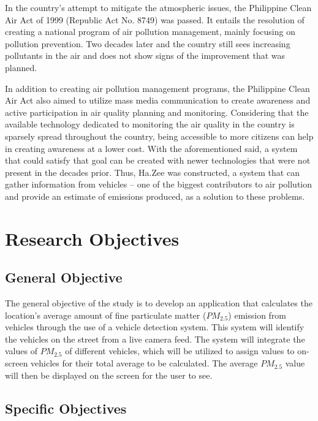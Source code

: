 In the country’s attempt to mitigate the atmospheric issues, the Philippine Clean Air Act of 1999 (Republic Act No. 8749) was passed. \cite{FAO} It entails the resolution of creating a national program of air pollution management, mainly focusing on pollution prevention. Two decades later and the country still sees increasing pollutants in the air and does not show signs of the improvement that was planned.

In addition to creating air pollution management programs, the Philippine Clean Air Act also aimed to utilize mass media communication to create awareness and active participation in air quality planning and monitoring. Considering that the available technology dedicated to monitoring the air quality in the country is sparsely spread throughout the country, being accessible to more citizens can help in creating awareness at a lower cost. With the aforementioned said, a system that could satisfy that goal can be created with newer technologies that were not present in the decades prior. Thus, Ha.Zee was constructed, a system that can gather information from vehicles – one of the biggest contributors to air pollution and provide an estimate of emissions produced, as a solution to these problems. 


\section{Research Objectives}
\label{sec:researchobjectives}

\subsection{General Objective}
\label{sec:generalobjective}


The general objective of the study is to develop an application that calculates the location’s average amount of  fine particulate matter ($PM_{2.5}$) emission from vehicles through the use of a vehicle detection system. This system will identify the vehicles on the street from a live camera feed. The system will integrate the values of $PM_{2.5}$  of different vehicles, which will be utilized to assign values to on-screen vehicles for their total average to be calculated. The average $PM_{2.5}$ value will then be displayed on the screen for the user to see.



\subsection{Specific Objectives}
\label{sec:specificobjectives}

